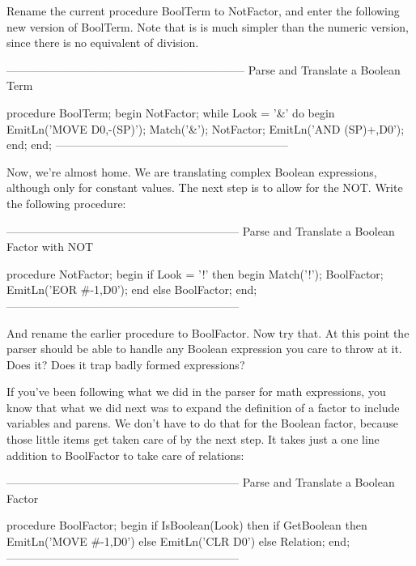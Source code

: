 \documentclass[float=false, crop=false]{standalone}
\begin{document}
Rename the current procedure BoolTerm to NotFactor, and enter the following new
version of BoolTerm. Note that is is much simpler than the numeric version,
since there is no equivalent of division.

\begin{code}
{---------------------------------------------------------------}
{ Parse and Translate a Boolean Term }

procedure BoolTerm;
begin
   NotFactor;
   while Look = '&' do begin
      EmitLn('MOVE D0,-(SP)');
      Match('&');
      NotFactor;
      EmitLn('AND (SP)+,D0');
   end;
end;
{--------------------------------------------------------------}
\end{code}

Now, we're almost home. We are translating complex Boolean expressions, although
only for constant values. The next step is to allow for the NOT. Write the
following procedure:

\begin{code}
{--------------------------------------------------------------}
{ Parse and Translate a Boolean Factor with NOT }

procedure NotFactor;
begin
   if Look = '!' then begin
      Match('!');
      BoolFactor;
      EmitLn('EOR #-1,D0');
      end
   else
      BoolFactor;
end;
{--------------------------------------------------------------}
\end{code}

And rename the earlier procedure to BoolFactor. Now try that. At this point the
parser should be able to handle any Boolean expression you care to throw at it.
Does it? Does it trap badly formed expressions?

If you've been following what we did in the parser for math expressions, you
know that what we did next was to expand the definition of a factor to include
variables and parens. We don't have to do that for the Boolean factor, because
those little items get taken care of by the next step. It takes just a one line
addition to BoolFactor to take care of relations:

\begin{code}
{--------------------------------------------------------------}
{ Parse and Translate a Boolean Factor }

procedure BoolFactor;
begin
   if IsBoolean(Look) then
      if GetBoolean then
         EmitLn('MOVE #-1,D0')
      else
         EmitLn('CLR D0')
      else Relation;
end;
{--------------------------------------------------------------}
\end{code}
\end{document}
